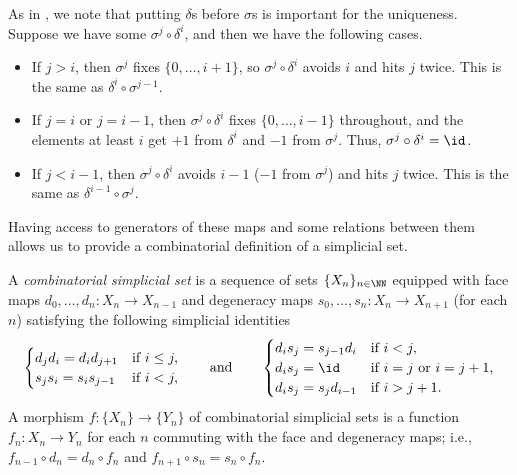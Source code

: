 \documentclass[../notes.tex]{subfiles}
\begin{document}
\begin{remark} \label{rem:delta-sigma-relation}
	As in , we note that putting $\delta$s before $\sigma$s is important for the uniqueness. Suppose we have some $\sigma^j\circ\delta^i$, and then we have the following cases.
	\begin{itemize}
		\item If $j>i$, then $\sigma^j$ fixes $\{0,\ldots,i+1\}$, so $\sigma^j\circ\delta^i$ avoids $i$ and hits $j$ twice. This is the same as $\delta^i\circ\sigma^{j-1}$.
		\item If $j=i$ or $j=i-1$, then $\sigma^j\circ\delta^i$ fixes $\{0,\ldots,i-1\}$ throughout, and the elements at least $i$ get $+1$ from $\delta^i$ and $-1$ from $\sigma^j$. Thus, $\sigma^j\circ\delta^i=\id$.
		\item If $j<i-1$, then $\sigma^j\circ\delta^i$ avoids $i-1$ ($-1$ from $\sigma^j$) and hits $j$ twice. This is the same as $\delta^{i-1}\circ\sigma^j$.
	\end{itemize}
\end{remark}
Having access to generators of these maps and some relations between them allows us to provide a combinatorial definition of a simplicial set.
\begin{definition}
	A \textit{combinatorial simplicial set} is a sequence of sets $\{X_n\}_{n\in\NN}$ equipped with face maps $d_0,\ldots,d_n\colon X_n\to X_{n-1}$ and degeneracy maps $s_0,\ldots,s_n\colon X_n\to X_{n+1}$ (for each $n$) satisfying the following simplicial identities
	\[\begin{cases}
		d_jd_i=d_id_{j+1} & \text{if }i\le j, \\
		s_js_i=s_is_{j-1} & \text{if }i<j, \\
	\end{cases}\qquad\text{and}\qquad\begin{cases}
		d_is_j=s_{j-1}d_i & \text{if }i<j, \\
		d_is_j={\id} & \text{if }i=j\text{ or }i=j+1, \\
		d_is_j=s_jd_{i-1} & \text{if }i>j+1.
	\end{cases}\]
	A morphism $f\colon \{X_n\}\to \{Y_n\}$ of combinatorial simplicial sets is a function $f_n\colon X_n\to Y_n$ for each $n$ commuting with the face and degeneracy maps; i.e., $f_{n-1}\circ d_n=d_n\circ f_n$ and $f_{n+1}\circ s_n=s_n\circ f_n$.
\end{definition}
\end{document}
